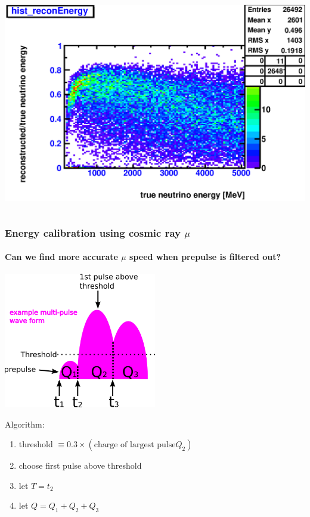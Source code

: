 \documentclass{beamer}
\begin{document}
\begin{frame}
\begin{columns}[T]
		\includegraphics[width=1.0\textwidth]{analyzed_mtq_flatSpectrum_numu_C12_outerBufferFillAll_reconVSTrueEnergy_onlyCC_maxR600cm.eps}
	\end{columns}
\end{frame}

\begin{frame}
	\frametitle{Energy calibration using cosmic ray $\mu$}
	\framesubtitle{Can we find more accurate $\mu$ speed when prepulse is filtered
	out?}
	\begin{center}
	\includegraphics[width=0.5\textwidth]{prepulse.png}
	\end{center}
	Algorithm:
	\begin{enumerate}
		\item threshold $\equiv 0.3 \times (\text{charge of largest pulse} Q_{2})$
		\item choose first pulse above threshold
		\item let $T = t_{2}$
		\item let $Q = Q_{1} + Q_{2} + Q_{3}$
	\end{enumerate}
	
\end{frame}
\end{document}
